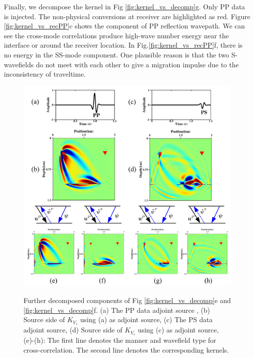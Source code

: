 Finally, we decompose the kernel in Fig \ref{fig:kernel_vs_decomp}g.
Only PP data is injected. The non-physical conversions at receiver are highlighted as red. 
Figure \ref{fig:kernel_vs_recPP}c shows the component of PP reflection wavepath.
We can see the cross-mode correlations produce high-wave number energy near the interface or around the
receiver location.
In Fig.\ref{fig:kernel_vs_recPP}f,
there is no energy in the SS-mode component. One plausible reason is that the two S-wavefields do
not meet with each other to give a migration impulse due to the inconsistency of traveltime. 
\begin{figure}[!htb]
   \centering
   {\includegraphics[width=1.0\textwidth]{Kernel/Combinations/K_vs_src_new.pdf}}
   \caption{
   Further decomposed components of Fig \ref{fig:kernel_vs_decomp}e and
   \ref{fig:kernel_vs_decomp}f. (a) The PP data adjoint source
   , (b) Source side of $K_{V_s}$ using (a) as adjoint source, 
   (c) The PS data adjoint source,
   (d) Source side of $K_{V_s}$ using (c) as adjoint source, 
   (e)-(h): 
   The first line denotes the manner and wavefield type for cross-correlation.
   The second line denotes the corresponding kernels.
   }
   \label{fig:kernel_vs_src}
\end{figure}
